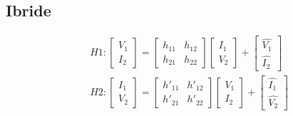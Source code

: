\documentclass{article}
\begin{document}
        \hfill
        \begin{minipage}[t]{.5\textwidth}
            \vspace{-\baselineskip}

            \subsection*{Ibride}
            \vspace{-\baselineskip}

                \begin{align*}
                    &H1:
                        \begin{bmatrix}
                            V_1\\
                            I_2
                        \end{bmatrix}
                        =
                        \begin{bmatrix}
                            h_{11} & h_{12}\\
                            h_{21} & h_{22}
                        \end{bmatrix}
                        \begin{bmatrix}
                            I_1\\
                            V_2
                        \end{bmatrix}
                        +
                        \begin{bmatrix}
                            \hat{V_1}\\
                            \hat{I_2}
                        \end{bmatrix}\\
                    &H2:
                        \begin{bmatrix}
                            I_1\\
                            V_2
                        \end{bmatrix}
                        =
                        \begin{bmatrix}
                            h'_{11} & h'_{12}\\
                            h'_{21} & h'_{22}
                        \end{bmatrix}
                        \begin{bmatrix}
                            V_1\\
                            I_2
                        \end{bmatrix}
                        +
                        \begin{bmatrix}
                            \hat{I_1}\\
                            \hat{V_2}
                        \end{bmatrix}
                \end{align*}


\end{minipage}
\end{document}
